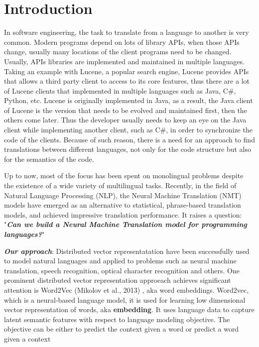 \section{Introduction}

In software engineering, the task to translate from a language to another is very common. Modern programs depend on lots of library APIs, when those APIs change, usually many locations of the client programs need to be changed. Usually, APIs libraries are implemented and maintained in multiple languages. Taking an example with Lucene, a popular search engine, Lucene provides APIs that allows a third party client to access to its core features, thus there are a lot of Lucene clients that implemented in multiple languages such as Java, C\#, Python, etc. Lucene is originally implemented in Java, as a result, the Java client of Lucene is the version that needs to be evolved and maintained first, then the others come later. Thus the developer usually needs to keep an eye on the Java client while implementing another client, such as C\#, in order to synchronize the code of the clients. Because of such reason, there is a need for an approach to find translations between different languages, not only for the code structure but also for the semantics of the code.

Up to now, most of the focus has been spent on monolingual problems despite the existence of a wide variety of multilingual tasks. Recently, in the field of Natural Language Processing (NLP), the Neural Machine Translation (NMT) models have emerged as an alternative to statistical, phrase-based translation models, and achieved impressive translation performance. It raises a question: "\textbf{\textit{Can we build a Neural Machine Translation model for programming languages?}}"

\textbf{\textit{Our approach}}: Distributed vector representatation have been successfully used to model natural languages and applied to problems such as neural machine translation, speech recognition, optical character recognition and others. One prominent distributed vector representation approeach achieves significant attention is Word2Vec (Mikolov et al., 2013) \cite{mikolov2013distributed}, aka word embeddings. Word2vec, which is a neural-based language model, it is used for learning low dimensional vector representation of words, aka \textbf{embedding}. It uses language data to capture latent semantic features with respect to language modeling objective. The objective can be either to predict the context given a word or predict a word given a context


